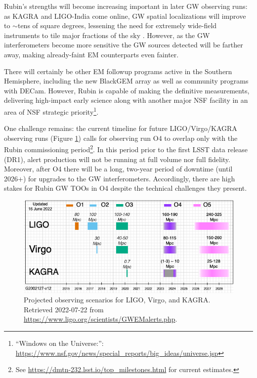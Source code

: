 \documentclass[DM,authoryear,toc]{lsstdoc}
\begin{document}
Rubin's strengths will become increasing important in later GW observing runs: 
as KAGRA and LIGO-India come online, GW spatial localizations will improve to $\sim$tens of square degrees, lessening the need for extremely wide-field instruments to tile major fractions of the sky \citep{2022ApJ...924...54P}.  
However, as the GW interferometers become more sensitive the GW sources detected will be farther away, making already-faint EM counterparts even fainter.

There will certainly be other EM followup programs active in the Southern Hemisphere, including the new BlackGEM array as well as community programs with DECam.
However, Rubin is capable of making the definitive measurements, delivering high-impact early science along with another major NSF facility in an area of NSF strategic priority\footnote{``Windows on the Universe:'': \url{https://www.nsf.gov/news/special_reports/big_ideas/universe.jsp}}.

One challenge remains: the current timeline for future LIGO/Virgo/KAGRA observing runs (Figure \ref{fig:scenarios}) calls for observing run O4 to overlap only with the Rubin commissioning period\footnote{See \url{https://dmtn-232.lsst.io/top_milestones.html} for current estimates.}.
In this period prior to the first LSST data release (DR1), alert production will not be running at full volume nor full fidelity.
Moreover, after O4 there will be a long, two-year period of downtime (until 2026+) for upgrades to the GW interferometers.  
Accordingly, there are high stakes for Rubin GW TOOs in O4 despite the technical challenges they present.

\begin{figure}
\includegraphics[width=\textwidth]{figures/LVK_run_plan_220615.png}
\caption{Projected observing scenarios for LIGO, Virgo, and KAGRA.  Retrieved 2022-07-22 from 
\url{https://www.ligo.org/scientists/GWEMalerts.php}.
	\label{fig:scenarios}}
\end{figure}
\end{document}
